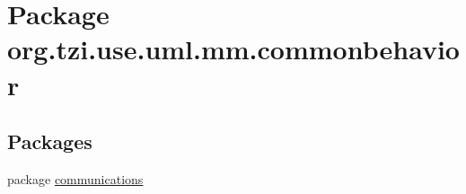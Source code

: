 \hypertarget{namespaceorg_1_1tzi_1_1use_1_1uml_1_1mm_1_1commonbehavior}{\section{Package org.\-tzi.\-use.\-uml.\-mm.\-commonbehavior}
\label{namespaceorg_1_1tzi_1_1use_1_1uml_1_1mm_1_1commonbehavior}
}
\subsection*{Packages}
\begin{DoxyCompactItemize}
\item 
package \hyperlink{namespaceorg_1_1tzi_1_1use_1_1uml_1_1mm_1_1commonbehavior_1_1communications}{communications}
\end{DoxyCompactItemize}
